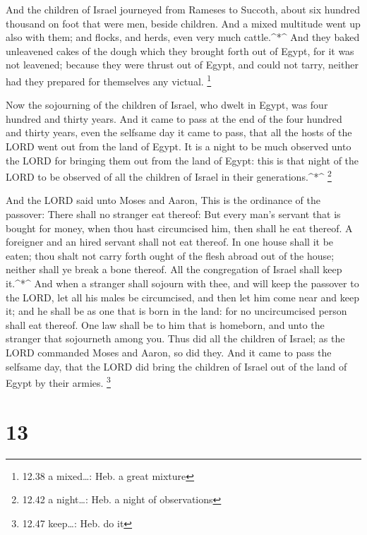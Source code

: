  And the children of Israel journeyed from Rameses to
Succoth, about six hundred thousand on foot that were men, beside
children.  And a mixed multitude went up also with them;
and flocks, and herds, even very much cattle.\^{}*\^{}  And
they baked unleavened cakes of the dough which they brought forth out of
Egypt, for it was not leavened; because they were thrust out of Egypt,
and could not tarry, neither had they prepared for themselves any
victual. \footnote{12.38 a mixed\ldots: Heb. a great mixture}

 Now the sojourning of the children of Israel, who dwelt in
Egypt, was four hundred and thirty years.  And it came to
pass at the end of the four hundred and thirty years, even the selfsame
day it came to pass, that all the hosts of the LORD went out from the
land of Egypt.  It is a night to be much observed unto the
LORD for bringing them out from the land of Egypt: this is that night of
the LORD to be observed of all the children of Israel in their
generations.\^{}*\^{} \footnote{12.42 a night\ldots: Heb. a night of
  observations}

 And the LORD said unto Moses and Aaron, This is the
ordinance of the passover: There shall no stranger eat thereof:
 But every man's servant that is bought for money, when
thou hast circumcised him, then shall he eat thereof.  A
foreigner and an hired servant shall not eat thereof.  In
one house shall it be eaten; thou shalt not carry forth ought of the
flesh abroad out of the house; neither shall ye break a bone thereof.
 All the congregation of Israel shall keep it.\^{}*\^{}
 And when a stranger shall sojourn with thee, and will keep
the passover to the LORD, let all his males be circumcised, and then let
him come near and keep it; and he shall be as one that is born in the
land: for no uncircumcised person shall eat thereof.  One
law shall be to him that is homeborn, and unto the stranger that
sojourneth among you.  Thus did all the children of Israel;
as the LORD commanded Moses and Aaron, so did they.  And it
came to pass the selfsame day, that the LORD did bring the children of
Israel out of the land of Egypt by their armies. \footnote{12.47
  keep\ldots: Heb. do it}

\hypertarget{section-12}{%
\section{13}\label{section-12}}

